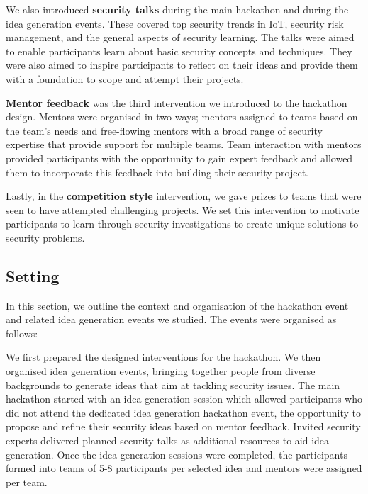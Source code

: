 \documentclass[runningheads]{llncs}
\begin{document}
We also introduced \textbf{security talks} during the main hackathon and during the idea generation events. These covered top security trends in IoT, security risk management, and the general aspects of security learning. The talks were aimed to enable participants learn about basic security concepts and techniques. They were also aimed to inspire participants to reflect on their ideas and provide them with a foundation to scope and attempt their projects.

\textbf{Mentor feedback} was the third intervention we introduced to the hackathon design. Mentors were organised in two ways; mentors assigned to teams based on the team's needs and free-flowing mentors with a broad range of security expertise that provide support for multiple teams. Team interaction with mentors provided participants with the opportunity to gain expert feedback and allowed them to incorporate this feedback into building their security project. 
 
Lastly, in the \textbf{competition style} intervention, we gave prizes to teams that were seen to have attempted challenging projects. We set this intervention to motivate participants to learn through security investigations to create unique solutions to security problems.



\subsection{Setting}\label{Sec:setting}
In this section, we outline the context and organisation of the hackathon event and related idea generation events we studied.
The events were organised as follows:

We first prepared the designed interventions for the hackathon. We then organised idea generation events, bringing together people from diverse backgrounds to generate ideas that aim at tackling security issues. 
The main hackathon started with an idea generation session which allowed participants who did not attend the dedicated idea generation hackathon event, the opportunity to propose and refine their security ideas based on mentor feedback. Invited security experts delivered planned security talks as additional resources to aid idea generation. 
Once the idea generation sessions were completed, the participants formed into teams of 5-8 participants per selected idea and mentors were assigned per team.
\end{document}
